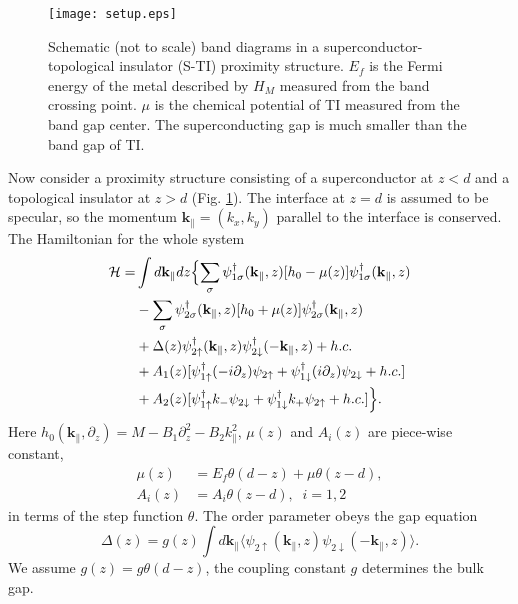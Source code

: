 \documentclass[11pt]{report}
\newcommand{\kp}{k_{+}}
\newcommand{\ki}{k_{-}}
\newcommand{\idz}{i\partial_z}
\begin{document}
\begin{figure}
\texttt{[image: setup.eps]}
\caption{Schematic (not to scale) band diagrams  in a superconductor-topological insulator (S-TI) proximity
structure. $E_f$ is the Fermi energy of the metal described by $H_M$ measured from the band crossing point. $\mu$ is
the chemical potential of TI measured from the band gap center. The superconducting gap
is much smaller than the band gap of TI.
}\label{setup}
\end{figure}

Now consider a proximity structure consisting 
of a superconductor at $z<d$ and a topological insulator at $z>d$ (Fig. \ref{setup}).
The interface at $z=d$ is assumed to be specular, so the momentum $\mathbf{k_\parallel}=(k_x,k_y)$ 
parallel to the interface is conserved. The Hamiltonian for the whole system 
\begin{align}
\mathcal{H} = &\int d \mathbf{k}_\parallel dz
\Bigl\{ \sum_{\sigma} \psi^{\dagger}_{1 \sigma}(\mathbf{k}_\parallel,z)[h_0 - \mu(z)] \psi^{\dagger}_{1 \sigma}(\mathbf{k}_\parallel,z) 
 \nonumber \\
&- \sum_{\sigma} \psi^{\dagger}_{2 \sigma}(\mathbf{k}_\parallel,z)[h_0 + \mu(z)] \psi^{\dagger}_{2 \sigma}(\mathbf{k}_\parallel,z)\nonumber \\
&+\Delta(z)  \psi^{\dagger}_{2 \uparrow}(\mathbf{k}_\parallel,z) \psi^{\dagger}_{2 \downarrow} (-\mathbf{k}_\parallel,z)+h.c.\nonumber \\
&+A_1(z) [\psi^{\dagger}_{1 \uparrow} (-\idz) \psi_{2 \uparrow} 
+\psi^{\dagger}_{1 \downarrow} (\idz) \psi_{2 \downarrow}+h.c.]  \nonumber\\
&+A_2(z)
[\psi^{\dagger}_{1 \uparrow} \ki \psi_{2 \downarrow} +\psi^{\dagger}_{1 \downarrow} \kp \psi_{2 \uparrow} +h.c.]
\Bigr \}. \label{hbH}
\end{align}
Here $h_0(\mathbf{k}_\parallel, \partial_z)=M -B_1 \partial_z^2 -B_2 k_\parallel^2$, $\mu(z)$ and $A_i(z)$
are piece-wise constant, 
\begin{align}
\mu(z)&=E_f\theta(d-z)+\mu\theta(z-d),\\
A_i(z)&=A_i\theta(z-d),\;\;i=1,2
\end{align}
in terms of the step function $\theta$. The order parameter obeys the gap equation
\begin{equation}
\Delta(z) = g(z) \int d \mathbf{k}_\parallel \langle {\psi_{2 \uparrow}(\mathbf{k}_\parallel,z) \psi_{2 \downarrow}(-\mathbf{k}_\parallel,z) }\rangle. \label{gapE}
\end{equation}
We assume $g(z)=g\theta(d-z)$, the coupling constant $g$ determines the bulk gap.
\end{document}
